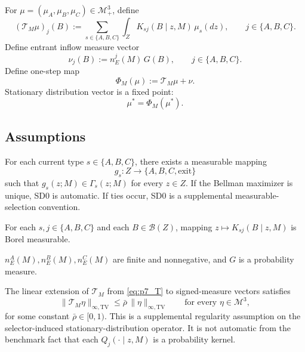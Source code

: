 For $\mu=(\mu_A,\mu_B,\mu_C)\in\mathcal M_+^3$, define
\begin{equation}
(\mathcal T_M\mu)_j(B):=\sum_{s\in\{A,B,C\}}\int_Z K_{sj}(B\mid z,M)\,\mu_s(dz),
\qquad j\in\{A,B,C\}.
\label{eq:p7_T}
\end{equation}
Define entrant inflow measure vector
\begin{equation}
\nu_j(B):=n_E^j(M)\,G(B),
\qquad j\in\{A,B,C\}.
\label{eq:p7_nu}
\end{equation}
Define one-step map
\begin{equation}
\Phi_M(\mu):=\mathcal T_M\mu+\nu.
\label{eq:p7_Phi}
\end{equation}
Stationary distribution vector is a fixed point:
\begin{equation}
\mu^*=\Phi_M(\mu^*).
\label{eq:p7_fixed_point}
\end{equation}

\subsection{Assumptions}

\begin{assumption}
For each current type $s\in\{A,B,C\}$, there exists a measurable mapping
\[
g_s:Z\to\{A,B,C,\mathrm{exit}\}
\]
such that $g_s(z;M)\in\Gamma_s(z;M)$ for every $z\in Z$. If the Bellman maximizer is unique, SD0 is automatic. If ties occur, SD0 is a supplemental measurable-selection convention.
\end{assumption}

\begin{assumption}
For each $s,j\in\{A,B,C\}$ and each $B\in\mathcal B(Z)$, mapping $z\mapsto K_{sj}(B\mid z,M)$ is Borel measurable.
\end{assumption}

\begin{assumption}
$n_E^A(M),n_E^B(M),n_E^C(M)$ are finite and nonnegative, and $G$ is a probability measure.
\end{assumption}

\begin{assumption}
The linear extension of $\mathcal T_M$ from \eqref{eq:p7_T} to signed-measure vectors satisfies
\begin{equation}
\|\mathcal T_M\eta\|_{\infty,\mathrm{TV}}
\le
\bar\rho\,\|\eta\|_{\infty,\mathrm{TV}}
\qquad\text{for every }\eta\in\mathcal M^3,
\label{eq:p7_operator_contraction}
\end{equation}
for some constant $\bar\rho\in[0,1)$. This is a supplemental regularity assumption on the selector-induced stationary-distribution operator. It is not automatic from the benchmark fact that each $Q_j(\cdot\mid z,M)$ is a probability kernel.
\end{assumption}

